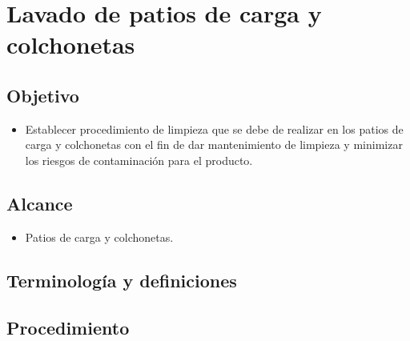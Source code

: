 \renewcommand{\MenorVer}{0}
\renewcommand{\MayorVer}{2}
\renewcommand{\Codigo}{HYS-10-IT}
\renewcommand{\FechaPub}{2023--01}
\renewcommand{\Titulo}{Lavado de patios de carga y colchonetas}

\section{\Titulo}

\subsection{Objetivo}

\begin{itemize}
	\item Establecer procedimiento de limpieza que se debe de realizar en los patios de carga y colchonetas con el fin de dar mantenimiento de limpieza y minimizar los riesgos de contaminación para el producto.
\end{itemize}

\subsection{Alcance}

\begin{itemize}
	\item Patios de carga y colchonetas.
\end{itemize}

\subsection{Terminología y definiciones}
\begin{description}
\end{description}



\subsection{Procedimiento}

